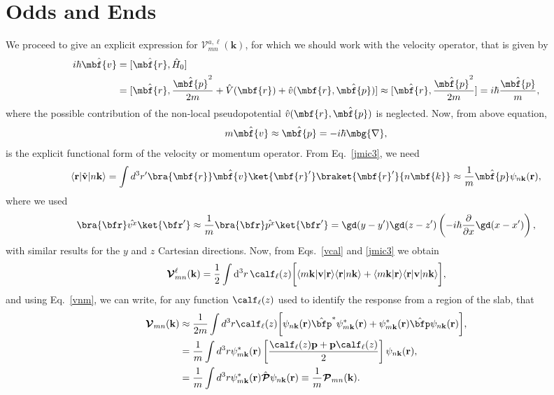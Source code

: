 \chapter{Odds and Ends}

We proceed to give an explicit expression for 
$\mathcal{V}^{a,\ell}_{mn}(\mathbf{k})$,
for which we should work with  
the velocity operator, that is given by
\begin{align}\label{vop2} 
i\hbar\hat{\mbf{v}}&=[\hat{\mbf{r}},\hat{H}_0]
\nonumber\\
&=
[\hat{\mbf{r}},\frac{\hat{\mbf{p}}^2}{2m} +
\hat{V}(\mbf{r})+\hat{v}(\mbf{r},\hat{\mbf{p}})]
\approx
[\hat{\mbf{r}},\frac{\hat{\mbf{p}}^2}{2m}]=i\hbar\frac{\hat{\mbf{p}}}{m},
\end{align} 
where the possible contribution of 
the non-local pseudopotential $\hat{v}(\mbf{r},\hat{\mbf{p}})$
is neglected. Now, from above equation,
\begin{equation}\label{velo}
m\hat{\mbf{v}}\approx\hat{\mbf{p}}=-i\hbar\mbg{\nabla},
\end{equation}
is the explicit functional form of the velocity or momentum operator.
From Eq.~\eqref{jmic3}, we need 
\begin{equation}\label{vnm}
\langle \mathbf{r} | \hat{\mathbf v} | n\mathbf{k} \rangle
=\int d^3 r' \bra{\mbf{r}}\hat{\mbf{v}}\ket{\mbf{r}'}
\braket{\mbf{r}'}{n\mbf{k}}
\approx\frac{1}{m}\hat{\mbf{p}}\psi_{n\mathbf{k}}(\mathbf{r}),
\end{equation} 
where we used 
\begin{equation}\label{rvnk}
\bra{\bfr}\hat{v^x}\ket{\bfr'}
\approx \frac{1}{m}\bra{\bfr}\hat{p^x}\ket{\bfr'}
=
\gd(y-y')\gd(z-z')\left(-i\hbar\frac{\partial}{\partial x}\gd(x-x')\right),
\end{equation}
with similar results for the $y$ and $z$ Cartesian directions.
Now, from 
Eqs.~\eqref{vcal} and \eqref{jmic3} we obtain
\begin{equation}
{\boldsymbol{\mathcal{V}}}^{\ell}_{mn}({\mathbf k})=
\frac{1}{2}
\int \mathrm{d}^3 r\,
 \calf_\ell(z)
\bigg[
\langle m\mathbf{k}|\mathbf{v} | \mathbf{r}\rangle
\langle \mathbf{r} | n \mathbf k \rangle +
\langle m\mathbf{k} | \mathbf{r}\rangle
\langle \mathbf{r} | \mathbf{v} | n \mathbf k \rangle\bigg],
\label{intj}
\end{equation}   
and using Eq.~\eqref{vnm},
we can write, for any  function $\calf_\ell(z)$ used
to identify the response from a region of the slab, that
\begin{align}%
{\boldsymbol{\mathcal{V}}}_{mn}(\mathbf{k})&\approx
\frac{1}{2m}\int d^3 r
\calf_\ell(z)
 \bigg[
\psi_{n\mathbf{k}}(\mathbf{r})
\hat\bfp^*\psi^*_{m\mathbf{k}}(\mathbf{r})
+ 
\psi^*_{m\mathbf{k}}(\mathbf{r})\hat\bfp
\psi_{n\mathbf{k}}(\mathbf{r})
\bigg], \label{pofs1}  \\
&=
\frac{1}{m}\int d^3 r
\psi^*_{m\mathbf{k}}(\mathbf{r})
\left[\frac{\calf_\ell(z) \mathbf{p} +
\mathbf{p} \calf_\ell(z)}{2}\right]
\psi_{n\mathbf{k}}(\mathbf{r})
,\label{pofs2} \\
&=\frac{1}{m}\int d^3 r
\psi^*_{m\mathbf{k}}(\mathbf{r})\hat{\boldsymbol{\mathcal{P}}}
\psi_{n\mathbf{k}}(\mathbf{r})\equiv \frac{1}{m}{\boldsymbol{\mathcal{P}}}_{mn}(\mathbf{k}).
\end{align}

